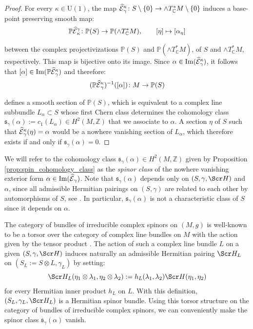 \documentclass[10pt,a4paper,twoside,reqno]{amsart}
\theoremstyle{plain}
\theoremstyle{definition}
\theoremstyle{remark}
\def\Z{\mathbb{Z}}
\def\C{\mathbb{C}}
\def\scS{\Scr H}
\def\U{\mathrm{U}}
\def\hcE{\smash{\widehat{\mathcal{E}}}}
\def\P{\mathbb{P}}
\def\Im{\mathrm{Im}}
\begin{document}
\begin{proof}
For every $\kappa\in\U(1)$, the map $\hcE^\kappa_\gamma\colon S\setminus\{0\} \to \wedge T^*_\C M\setminus\{0\}$ induces a base-point preserving smooth map: 
\begin{equation*}
\P\hcE^{\gamma}_{\kappa} \colon\P(S)\to\P(\wedge T^*_\C M),\qquad [\eta] \mapsto[\alpha_{\eta}]    
\end{equation*} 

\noindent
between the complex projectivizations $\P(S)$ and $\P(\wedge T^*_\C M)$, of $S$ and $\wedge T^*_\C M$, respectively. This map is bijective onto its image. Since $\alpha\in\Im(\hcE^\kappa_\gamma)$, it follows that $[\alpha] \in \Im(\P\hcE^\kappa_\gamma)$ and therefore: 
\begin{equation*}
(\P\hcE^\kappa_\gamma)^{-1}([\alpha]) \colon M \to  \P(S)
\end{equation*}

\noindent
defines a smooth section of $\P(S)$, which is equivalent to a complex line subbundle $L_{\alpha}\subset S$ whose first Chern class determines the cohomology class $\mathfrak{s}_{\gamma}(\alpha):=c_1(L_\alpha)\in H^2(M,\Z)$ that we associate to $\alpha$. A section $\eta$ of $S$ such that $\hcE^\kappa_\gamma(\eta)=\alpha$ would be a nowhere vanishing section of $L_{\alpha}$, which therefore exists if and only if $\mathfrak{s}_{\gamma}(\alpha) = 0$.
\end{proof}

We will refer to the cohomology class $\mathfrak{s}_{\gamma}(\alpha)\in H^2(M,\Z)$ given by Proposition \ref{prop:spin_cohomology_class} as the \emph{spinor class} of the nowhere vanishing exterior form $\alpha\in\Im(\hcE_\gamma)$. Note that $\mathfrak{s}_{\gamma}(\alpha)$ depends only on $(S,\gamma,\scS)$ and $\alpha$, since all admissible Hermitian pairings on $(S,\gamma)$ are related to each other by automorphisms of $S$, see \cite[Prop.\ 3.10]{Algebraic_Complex_Square_2025}. In particular, $\mathfrak{s}_{\gamma}(\alpha)$ is not a characteristic class of $S$ since it depends on $\alpha$.\medskip

The category of bundles of irreducible complex spinors on $(M,g)$ is well-known to be a torsor over the category of complex line bundles on $M$ with the action given by the tensor product \cite{FriedrichTrautman,LS18}. The action of such a complex line bundle $L$ on a given $(S,\gamma,\scS)$ induces naturally an admissible Hermitian pairing $\scS_L$ on $(S_L:=S\otimes L, \gamma_L) $ by setting:
\begin{equation}\label{eq:Hermitial_HL}
    \scS_L(\eta_1\otimes\lambda_1,\eta_2\otimes\lambda_2):=h_L(\lambda_1,\lambda_2)\scS(\eta_1,\eta_2)   
\end{equation}
for every Hermitian inner product $h_L$ on $L$. With this definition, $(S_L,\gamma_L,\scS_L)$ is a Hermitian spinor bundle. Using this torsor structure on the category of bundles of irreducible complex spinors, we can conveniently make the spinor class $\mathfrak{s}_{\gamma}(\alpha)$ vanish.
\end{document}

